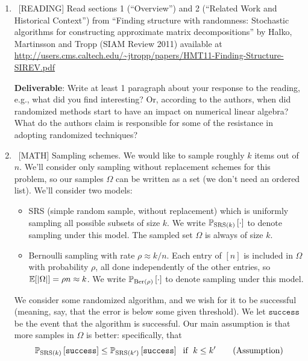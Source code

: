 \documentclass[10pt, letterpaper]{scrartcl}
\begin{document}
\begin{enumerate}[align=left, leftmargin=*, label=\sffamily\bfseries Problem \arabic*:]   
 
    \item \ [READING] Read sections 1 (``Overview'') and 2 (``Related Work and Historical Context'') from ``Finding structure with randomness: Stochastic algorithms for constructing approximate matrix decompositions'' by Halko, Martinsson and Tropp (SIAM Review 2011) available at     
    \url{http://users.cms.caltech.edu/~jtropp/papers/HMT11-Finding-Structure-SIREV.pdf}
    
    \textbf{Deliverable}:
Write at least 1 paragraph about your response to the reading, e.g., what did you find interesting? Or, according to the authors, when did randomized methods start to have an impact on numerical linear algebra? What do the authors claim is responsible for some of the resistance in adopting randomized techniques?

\item \ [MATH] Sampling schemes.  We would like to sample roughly $k$ items out of $n$. We'll consider only sampling without replacement schemes for this problem, so our samples $\Omega$ can be written as a set (we don't need an ordered list).  We'll consider two models:
{
\renewcommand{\S}{\texttt{success}}
\newcommand{\bigmid}{\,\big|\,}
\newcommand{\probk}[2]{\P_{\text{SRS}(#1)}\left[#2\right]} %
\newcommand{\probrho}[2]{\P_{\text{Ber}(#1)}\left[#2\right]}
\begin{itemize}
\item SRS (simple random sample, without replacement) which is uniformly sampling all possible subsets of size $k$. We write $\probk{k}{\cdot}$ to denote sampling under this model.  The sampled set $\Omega$ is always of size $k$.
\item Bernoulli sampling with rate $\rho \approx k/n$. Each entry of $[n]$ is included in $\Omega$ with probability $\rho$, all done independently of the other entries, so $\operatorname{\mathbb{E}}[ |\Omega| ] = \rho n \approx k$. We write $\probrho{\rho}{\cdot}$ to denote sampling under this model.
\end{itemize}


We consider some randomized algorithm, and we wish for it to be successful (meaning, say, that the error is below some given threshold). We let $\S$ be the event that the algorithm is successful.  Our main assumption is that more samples in $\Omega$ is better: specifically, that 
\begin{equation}\label{assumption}
\probk{k}{\S} \le \probk{k'}{\S}\; \text{ if }\; k\le k' \tag{Assumption}
\end{equation}



}
\end{enumerate}
\end{document}
